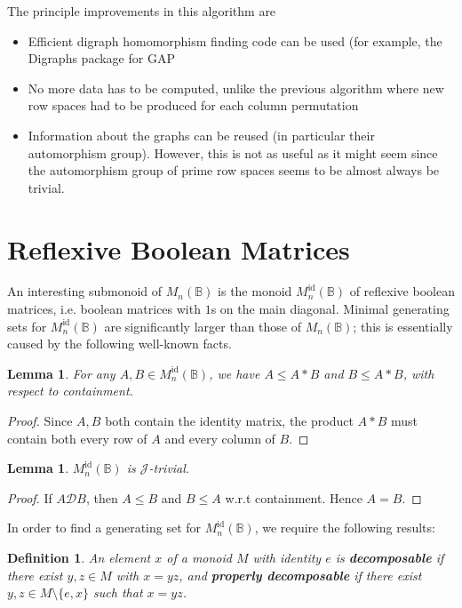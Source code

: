 \documentclass[11pt]{article}
\newtheorem{lemma}[thm]{Lemma}
\newtheorem{defi}[thm]{Definition}
\newcommand{\defn}[1]{\textbf{\textit{#1}}}
\numberwithin{equation}{section}
\newcommand{\B}{\mathbb{B}}
\newcommand{\Bn}{M_n(\B)}
\newcommand{\Refn}{M_n^{\text{id}}(\B)}
\newcommand{\D}{\mathscr{D}}
\newcommand{\J}{\mathscr{J}}
\begin{document}
The principle improvements in this algorithm are
\begin{itemize}
  \item 
    Efficient digraph homomorphism finding code can be used (for example, the
    Digraphs package for GAP~\cite{Digraphs2020aa}
  \item
    No more data has to be computed, unlike the previous algorithm where new row
    spaces had to be produced for each column permutation
  \item
    Information about the graphs can be reused (in particular their automorphism
    group). However, this is not as useful as it might seem since the
    automorphism group of prime row spaces seems to be almost always be trivial.
\end{itemize}

\section{Reflexive Boolean Matrices}
An interesting submonoid of $\Bn$ is the monoid $\Refn$ of reflexive boolean
matrices, i.e. boolean matrices with $1$s on the main diagonal. Minimal
generating sets for $\Refn$ are significantly larger than those of $\Bn$; this
is essentially caused by the following well-known facts.

\begin{lemma}
  For any $A, B \in \Refn$, we have $A \leq A * B$ and $B \leq A * B$, with
  respect to containment.
\end{lemma}
\begin{proof}
  Since $A, B$ both contain the identity matrix, the product $A * B$ must
  contain both every row of $A$ and every column of $B$.
\end{proof}

\begin{lemma}
  $\Refn$ is $\J$-trivial. 
\end{lemma}
\begin{proof}
  If $A \D B$, then $A \leq B$ and $B \leq A$ w.r.t containment. Hence $A = B$.    
\end{proof}


In order to find a generating set for $\Refn$, we require the following results:

\begin{defi}
  An element $x$ of a monoid $M$ with identity $e$ is \defn{decomposable} if
  there exist $y, z \in M$ with $x = yz$, and \defn{properly decomposable} if
  there exist $y, z \in M\setminus\{e, x\}$ such that $x = yz$.
\end{defi}
\end{document}
